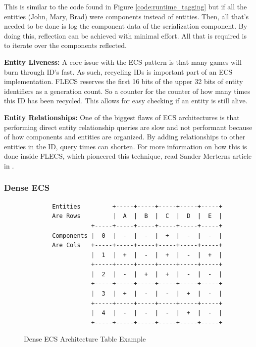 This is similar to the code found in Figure \ref{code:runtime_tagging} but if all the entities (John, Mary, Brad) were components instead of entities. Then, all that's needed to be done is log the component data of the serialization component. By doing this, reflection can be achieved with minimal effort. All that is required is to iterate over the components reflected.

\textbf{Entity Liveness:}
A core issue with the ECS pattern is that many games will burn through ID's fast. As such, recycling IDs is important part of an ECS implementation. FLECS reserves the first 16 bits of the upper 32 bits of entity identifiers as a generation count. So a counter for the counter of how many times this ID has been recycled. This allows for easy checking if an entity is still alive.  

\textbf{Entity Relationships:}
One of the biggest flaws of ECS architectures is that performing direct entity relationship queries are slow and not performant because of how components and entities are organized. By adding relationships to other entities in the ID, query times can shorten. For more information on how this is done inside FLECS, which pioneered this technique, read Sander Merterns article in \cite{SanderMertensEntityIDs}.

\subsubsection{Dense ECS}
\begin{figure}[htbp]
    \centering
    \begin{verbatim}
        Entities         +-----+-----+-----+-----+-----+  
        Are Rows         |  A  |  B  |  C  |  D  |  E  |  
                   +-----+-----+-----+-----+-----+-----+  
        Components |  0  |  -  |  -  |  +  |  -  |  -  |  
        Are Cols   +-----+-----+-----+-----+-----+-----+  
                   |  1  |  +  |  -  |  +  |  -  |  +  |  
                   +-----+-----+-----+-----+-----+-----+  
                   |  2  |  -  |  +  |  +  |  -  |  -  |  
                   +-----+-----+-----+-----+-----+-----+  
                   |  3  |  +  |  -  |  -  |  +  |  -  |  
                   +-----+-----+-----+-----+-----+-----+  
                   |  4  |  -  |  -  |  -  |  +  |  -  |  
                   +-----+-----+-----+-----+-----+-----+                                 
    \end{verbatim}
    \caption{Dense ECS Architecture Table Example}
\end{figure}

